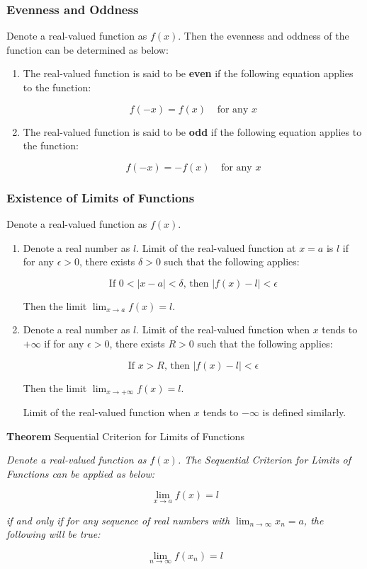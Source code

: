 \documentclass[a4paper,12pt]{article}
\newcommand{\s}{\vspace{1mm}}
\newcommand{\n}{\vspace{3mm}}
\newenvironment{block}[4][Block]{ %
\begin{list}{}{
  \setlength{\leftmargin}{0mm}
  \setlength{\rightmargin}{0mm}
  \setlength{\topsep}{0mm}
  \setlength{\partopsep}{0mm}
  \parsep\parskip
  \setlength{\itemsep}{-\parsep}
  }
  \needspace{\baselineskip}
  \item \textbf{#2 #3} \hspace{1mm} #4
  \vspace{1mm}
  \item
  }
{
\end{list}
}
\newenvironment{alist}{ %
\begin{enumerate}[label=(\alph*)]
}{
\end{enumerate}
}
\begin{document}
\subsubsection{Evenness and Oddness}
Denote a real-valued function as $f(x)$. Then the evenness and oddness of the function can be determined as below:
\begin{alist}
  \item The real-valued function is said to be \textbf{even} if the following equation applies to the function:

  $$f(-x)=f(x)\;\;\;\;\text{for any }x$$
  \item The real-valued function is said to be \textbf{odd} if the following equation applies to the function:

  $$f(-x)=-f(x)\;\;\;\;\text{for any }x$$
\end{alist}

\subsubsection{Existence of Limits of Functions}
Denote a real-valued function as $f(x)$.
\begin{alist}
  \item Denote a real number as $l$. Limit of the real-valued function at $x=a$ is $l$ if for any $\epsilon>0$, there exists $\delta>0$ such that the following applies:

  $$\text{If }0<\left| x-a\right| <\delta\text{, then }\left| f(x)-l\right| <\epsilon$$\s

  Then the limit $\lim_{x\to a}f(x)=l$.
  \item Denote a real number as $l$. Limit of the real-valued function when $x$ tends to $+\infty$ if for any $\epsilon>0$, there exists $R>0$ such that the following applies:

  $$\text{If }x>R\text{, then }\left| f(x)-l\right| <\epsilon$$\s

  Then the limit $\lim_{x\to +\infty}f(x)=l$.\n

  Limit of the real-valued function when $x$ tends to $-\infty$ is defined similarly.
\end{alist}

\begin{block}{Theorem}{}{Sequential Criterion for Limits of Functions}
  \textit{Denote a real-valued function as $f(x)$. The Sequential Criterion for Limits of Functions can be applied as below:}

  $$\lim_{x\to a}f(x)=l$$\s

  \textit{if and only if for any sequence of real numbers with $\lim_{n\to \infty}x_{n}=a$, the following will be true:}

  $$\lim_{n\to \infty}f(x_{n})=l$$
\end{block}
\end{document}
